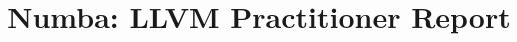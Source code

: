 \documentclass{acm_proc_article-sp}
\begin{document}
\title{Numba: LLVM Practitioner Report}
%
%
%
%
%
\end{document}
